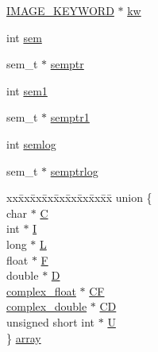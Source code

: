 \begin{DoxyCompactItemize}
\begin{tabbing}
\end{tabbing}\item 
\hyperlink{structIMAGE__KEYWORD}{I\+M\+A\+G\+E\+\_\+\+K\+E\+Y\+W\+O\+R\+D} $\ast$ \hyperlink{structIMAGE_a94f6d5b80f0a8b954324d506c79fe724}{kw}
\item 
int \hyperlink{structIMAGE_a6a50020081f8e319972497690237fb66}{sem}
\item 
sem\+\_\+t $\ast$ \hyperlink{structIMAGE_a2fb19918a0e2f024cd9c8470792671cc}{semptr}
\item 
int \hyperlink{structIMAGE_aff137290d0abaaa812c25d1e691a0c96}{sem1}
\item 
sem\+\_\+t $\ast$ \hyperlink{structIMAGE_a571f6924906d5a7d397ba98d23a90773}{semptr1}
\item 
int \hyperlink{structIMAGE_a6ae15b91c6c2c32555c3254cd292c6ef}{semlog}
\item 
sem\+\_\+t $\ast$ \hyperlink{structIMAGE_a014a6c3a0f089094846a4d7f9ecb5f62}{semptrlog}
\item 
\begin{tabbing}
xx\=xx\=xx\=xx\=xx\=xx\=xx\=xx\=xx\=\kill
union \{\\
\>char $\ast$ \hyperlink{structIMAGE_ac8837a25e2fde9748fbb1e9951ed8243}{C}\\
\>int $\ast$ \hyperlink{structIMAGE_a24cd6d71c4bf1c01e62fbafd80d48443}{I}\\
\>long $\ast$ \hyperlink{structIMAGE_aa8880295748522b823bef4732f5df685}{L}\\
\>float $\ast$ \hyperlink{structIMAGE_ac30512e1d0da8b4052f22f4c5f322398}{F}\\
\>double $\ast$ \hyperlink{structIMAGE_a2e99432d107ade121e1765fc1056936d}{D}\\
\>\hyperlink{structcomplex__float}{complex\_float} $\ast$ \hyperlink{structIMAGE_a511ca0aa5f2af1a79ee4d217abf08745}{CF}\\
\>\hyperlink{structcomplex__double}{complex\_double} $\ast$ \hyperlink{structIMAGE_a87e4a923342b434dacfdead3d3949dae}{CD}\\
\>unsigned short int $\ast$ \hyperlink{structIMAGE_a0e75d3dd1879fa0d0fa9caaa80a1074a}{U}\\
\} \hyperlink{structIMAGE_a720a7f653054fc968e965aa161c64d08}{array}\\

\end{tabbing}\end{DoxyCompactItemize}


